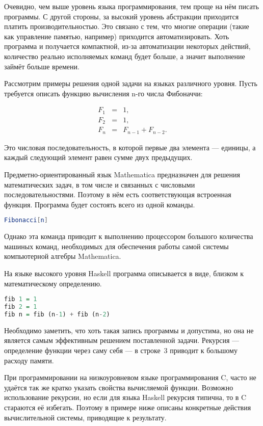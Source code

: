 Очевидно, чем выше уровень языка программирования, тем проще на нём
писать программы. С другой стороны, за высокий уровень абстракции
приходится платить производительностью. Это связано с тем, что многие
операции (такие как управление памятью, например) приходится
автоматизировать. Хоть программа и получается компактной, из-за
автоматизации некоторых действий, количество реально исполняемых
команд будет больше, а значит выполнение займёт больше времени.

Рассмотрим примеры решения одной задачи на языках различного уровня.
Пусть требуется описать функцию вычисления n-го числа Фибоначчи:

\begin{eqnarray*}
F_{1} & = & 1,\\
F_{2} & = & 1,\\
F_{n} & = & F_{n-1}+F_{n-2}.
\end{eqnarray*}

Это числовая последовательность, в которой первые два элемента —
единицы, а каждый следующий элемент равен сумме двух предыдущих.

Предметно-ориентированный язык Mathematica предназначен для решения
математических задач, в том числе и связанных с числовыми
последовательностями. Поэтому в нём есть соответствующая встроенная
функция. Программа будет состоять всего из одной команды.

\begin{lstlisting}[language=Mathematica]
Fibonacci[n]
\end{lstlisting}

Однако эта команда приводит к выполнению процессором большого
количества машиных команд, необходимых для обеспечения работы самой
системы компьютерной алгебры Mathematica.

На языке высокого уровня Haskell программа описывается в виде, близком
к математическому определению.

\begin{lstlisting}[language=Haskell]
fib 1 = 1
fib 2 = 1
fib n = fib (n-1) + fib (n-2)
\end{lstlisting}

Необходимо заметить, что хоть такая запись программы и допустима, но
она не является самым эффективным решением поставленной задачи.
Рекурсия — определение функции через саму себя — в строке~3 приводит к
большому расходу памяти.

При программировании на низкоуровневом языке программирования C, часто
не удаётся так же кратко указать свойства вычисляемой функции.
Возможно использование рекурсии, но если для языка Haskell рекурсия
типична, то в C стараются её избегать. Поэтому в примере ниже описаны
конкретные действия вычислительной системы, приводящие к результату.

